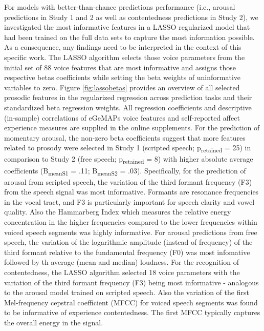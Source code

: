 \documentclass[
  english,
  man,floatsintext]{apa6}
\begin{document}
For models with better-than-chance predictions performance (i.e., arousal predictions in Study 1 and 2 as well as contentedness predictions in Study 2), we investigated the most informative features in a LASSO regularized model that had been trained on the full data sets to capture the most information possible. As a consequence, any findings need to be interpreted in the context of this specific work. The LASSO algorithm selects those voice parameters from the initial set of 88 voice features that are most informative and assigns those respective betas coefficients while setting the beta weights of uninformative variables to zero. Figure \ref{fig:lassobetas} provides an overview of all selected prosodic features in the regularized regression across prediction tasks and their standardized beta regression weights. All regression coefficients and descriptive (in-sample) correlations of eGeMAPs voice features and self-reported affect experience measures are supplied in the online supplements.
For the prediction of momentary arousal, the non-zero beta coefficients suggest that more features related to prosody were selected in Study 1 (scripted speech; p\textsubscript{retained} = 25) in comparison to Study 2 (free speech; p\textsubscript{retained} = 8) with higher absolute average coefficients (B\textsubscript{meanS1} = .11; B\textsubscript{meanS2} = .03). Specifically, for the prediction of arousal from scripted speech, the variation of the third formant frequency (F3) from the speech signal was most informative. Formants are resonance frequencies in the vocal tract, and F3 is particularly important for speech clarity and vowel quality. Also the Hammarberg Index which measures the relative energy concentration in the higher frequencies compared to the lower frequencies within voiced speech segments was highly informative.
For arousal predictions from free speech, the variation of the logarithmic amplitude (instead of frequency) of the third formant relative to the fundamental frequency (F0) was most infomative followed by th average (mean and median) loudness.
For the recognition of contentedness, the LASSO algorithm selected 18 voice parameters with the variation of the third formant frequency (F3) being most informative - analogous to the arousal model trained on scripted speech. Also the variation of the first Mel-frequency cepstral coefficient (MFCC) for voiced speech segments was found to be informative of experience contentedness. The first MFCC typically captures the overall energy in the signal.
\newpage
\end{document}
